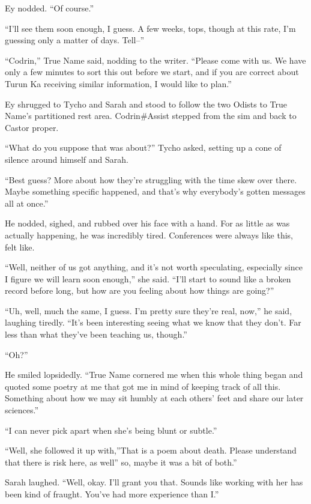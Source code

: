 Ey nodded. ``Of course.''

``I'll see them soon enough, I guess. A few weeks, tops, though at this rate, I'm guessing only a matter of days. Tell--''

``Codrin,'' True Name said, nodding to the writer. ``Please come with us. We have only a few minutes to sort this out before we start, and if you are correct about Turun Ka receiving similar information, I would like to plan.''

Ey shrugged to Tycho and Sarah and stood to follow the two Odists to True Name's partitioned rest area. Codrin\#Assist stepped from the sim and back to Castor proper.

``What do you suppose that was about?'' Tycho asked, setting up a cone of silence around himself and Sarah.

``Best guess? More about how they're struggling with the time skew over there. Maybe something specific happened, and that's why everybody's gotten messages all at once.''

He nodded, sighed, and rubbed over his face with a hand. For as little as was actually happening, he was incredibly tired. Conferences were always like this, felt like.

``Well, neither of us got anything, and it's not worth speculating, especially since I figure we will learn soon enough,'' she said. ``I'll start to sound like a broken record before long, but how are you feeling about how things are going?''

``Uh, well, much the same, I guess. I'm pretty sure they're real, now,'' he said, laughing tiredly. ``It's been interesting seeing what we know that they don't. Far less than what they've been teaching us, though.''

``Oh?''

He smiled lopsidedly. ``True Name cornered me when this whole thing began and quoted some poetry at me that got me in mind of keeping track of all this. Something about how we may sit humbly at each others' feet and share our later sciences.''

``I can never pick apart when she's being blunt or subtle.''

``Well, she followed it up with,''That is a poem about death. Please understand that there is risk here, as well'' so, maybe it was a bit of both.''

Sarah laughed. ``Well, okay. I'll grant you that. Sounds like working with her has been kind of fraught. You've had more experience than I.''


